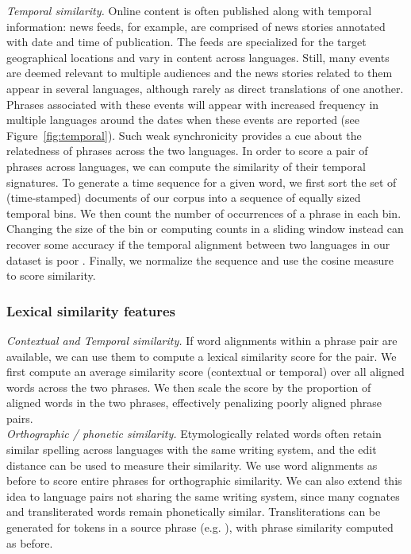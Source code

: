 \documentclass[11pt]{article}
\newcommand{\mnote}[1]{\marginpar{%
  \vskip-\baselineskip
  \raggedright\footnotesize
  \itshape\hrule\smallskip\tiny{#1}\par\smallskip\hrule}}
\newcommand{\mtodo}[1]{\mnote{\textcolor{red}{#1}}}
\newcommand{\figref}[1]{Figure~\ref{#1}}
\begin{document}
\noindent\emph{Temporal similarity.} Online content is often published along with temporal information: news feeds, for example, are comprised of news stories annotated with date and time of publication.  The feeds are specialized for the target geographical locations and vary in content across languages.  Still, many events are deemed relevant to multiple audiences and the news stories related to them appear in several languages, although rarely as direct translations of one another.  Phrases associated with these events will appear with increased frequency in multiple languages around the dates when these events are reported (see \figref{fig:temporal}).  Such weak synchronicity provides a cue about the relatedness of phrases across the two languages.  In order to score a pair of phrases across languages, we can compute the similarity of their temporal signatures. To generate a time sequence for a given word, we first sort the set of (time-stamped) documents of our corpus into a sequence of equally sized temporal bins.  We then count the number of occurrences of a phrase in each bin.  Changing the size of the bin or computing counts in a sliding window instead can recover some accuracy if the temporal alignment between two languages in our dataset is poor \cite{Klementiev:2006b}.  Finally, we normalize the sequence and use the cosine measure to score similarity. 

\subsubsection{Lexical similarity features}  \label{sect:lexfeats}

\noindent\emph{Contextual and Temporal similarity.}  If word alignments within a phrase pair are available, we can use them to compute a lexical similarity score for the pair.  We first compute an average similarity score (contextual or temporal) over all aligned words across the two phrases.  We then scale the score by the proportion of aligned words in the two phrases, effectively penalizing poorly aligned phrase pairs.\mtodo{A (trivial) equation here?}\\

\noindent\emph{Orthographic / phonetic similarity.} Etymologically related words often retain similar spelling across languages with the same writing system, and the edit distance can be used to measure their similarity.  We use word alignments as before to score entire phrases for orthographic similarity.\mtodo{Not done quite the same as above but will glance over it.} We can also extend this idea to language pairs not sharing the same writing system, since many cognates and transliterated words remain phonetically similar.  Transliterations can be generated for tokens in a source phrase (e.g. \cite{Virga:2003,Irvine:2010a}), with phrase similarity computed as before.\\
\end{document}
